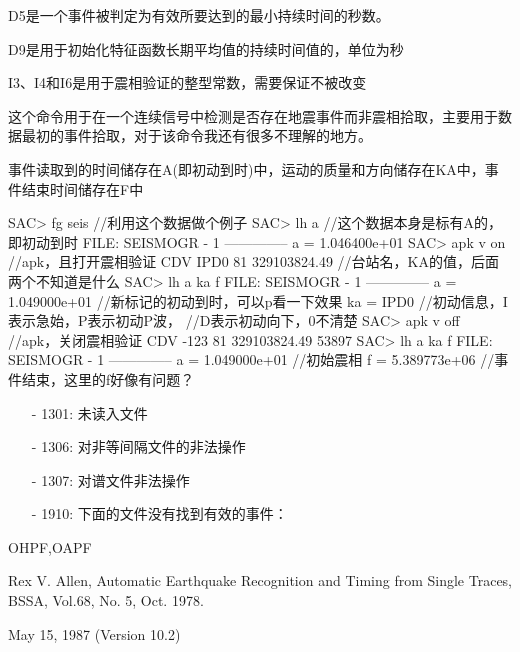 D5是一个事件被判定为有效所要达到的最小持续时间的秒数。

D9是用于初始化特征函数长期平均值的持续时间值的，单位为秒

I3、I4和I6是用于震相验证的整型常数，需要保证不被改变

这个命令用于在一个连续信号中检测是否存在地震事件而非震相拾取，主要用于数据最初的事件拾取，对于该命令我还有很多不理解的地方。

事件读取到的时间储存在A(即初动到时)中，运动的质量和方向储存在KA中，事件结束时间储存在F中

\begin{SACCode}
SAC> fg seis                //利用这个数据做个例子
SAC> lh a                   //这个数据本身是标有A的，即初动到时
  FILE: SEISMOGR - 1
 --------------
     a = 1.046400e+01
SAC> apk v on               //apk，且打开震相验证
 CDV IPD0 81 329103824.49   //台站名，KA的值，后面两个不知道是什么
SAC> lh a ka f
  FILE: SEISMOGR - 1
 --------------
      a = 1.049000e+01      //新标记的初动到时，可以p看一下效果
     ka = IPD0              //初动信息，I表示急始，P表示初动P波，
                            //D表示初动向下，0不清楚
SAC> apk v off              //apk，关闭震相验证
 CDV -123 81 329103824.49                                              53897
SAC> lh a ka f		
  FILE: SEISMOGR - 1
 --------------
     a = 1.049000e+01       //初始震相
     f = 5.389773e+06       //事件结束，这里的f好像有问题？
\end{SACCode}

\begin{itemize}
\item[-]1301: 未读入文件
\item[-]1306: 对非等间隔文件的非法操作
\item[-]1307: 对谱文件非法操作
\end{itemize}

\begin{itemize}
\item[-]1910: 下面的文件没有找到有效的事件：
\end{itemize}

OHPF,OAPF 

Rex V. Allen, Automatic Earthquake Recognition and Timing from Single Traces, BSSA, Vol.68, No. 5, Oct. 1978.

May 15, 1987 (Version 10.2)
